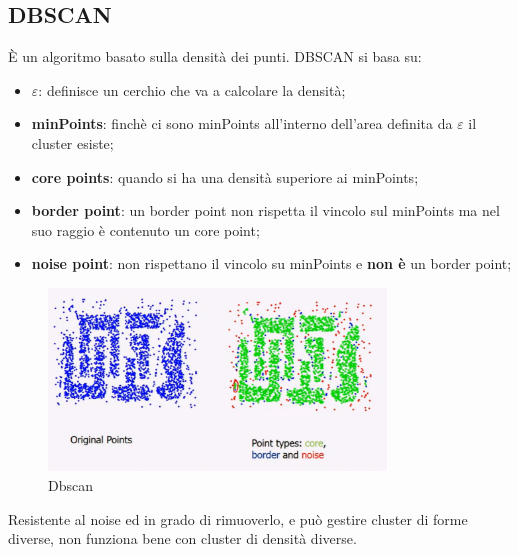 \documentclass[12pt]{article}
\begin{document}
\subsection{DBSCAN}
\`E un algoritmo basato sulla densit\`a dei punti. DBSCAN si basa su:
\begin{itemize}
    \item $\varepsilon$: definisce un cerchio che va a calcolare la densit\`a;
    \item \textbf{minPoints}: finch\`e ci sono minPoints all'interno dell'area definita da $\varepsilon$ il cluster esiste;
    \item \textbf{core points}: quando si ha una densit\`a superiore ai minPoints;
    \item \textbf{border point}: un border point non rispetta il vincolo sul minPoints ma nel suo raggio \`e contenuto un core point;
    \item \textbf{noise point}: non rispettano il vincolo su minPoints e \textbf{non \`e } un border point;
\end{itemize}
\begin{figure}[H]
    \centering
    \includegraphics[width=0.8\textwidth]{dbscan.png}
    \caption{Dbscan}
    \label{fig:dbscan}
\end{figure}
Resistente al noise ed in grado di rimuoverlo, e pu\`o gestire cluster di forme diverse, non funziona bene con cluster di densit\`a diverse.






\newpage
\end{document}
